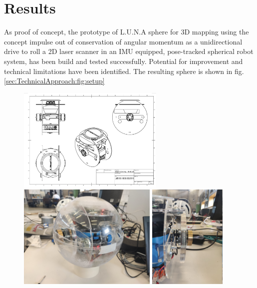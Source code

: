 \section{Results}
\label{sec:Results}

As proof of concept, the prototype of L.U.N.A sphere for 3D mapping using the concept impulse out of conservation of angular momentum as a unidirectional drive to roll a 2D laser scanner in an IMU equipped, pose-tracked spherical robot system, has been build and tested successfully. Potential for improvement and technical limitations have been identified.
The resulting sphere is shown in fig. \ref{sec:TechnicalApproach:fig:setup}
\begin{figure}
\centering                                                                                                                                                                                                        
\includegraphics[height=50mm]{../Media/BlueprintPNG.png}                                                                                                                                                      
\includegraphics[height=50mm]{../Media/sphereFullshellLeft.jpg}
\includegraphics[height=50mm]{../Media/sphereRightMotor.jpg}   

\end{figure}
